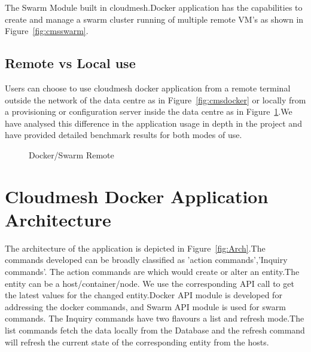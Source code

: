 \documentclass[9pt,twocolumn,twoside]{../../styles/osajnl}
\begin{document}
The Swarm Module built in cloudmesh.Docker application has the capabilities to create and manage a swarm cluster running of multiple remote VM's as shown in Figure~\ref{fig:cmsswarm}. 
\subsection{Remote vs Local use}
Users can choose to use cloudmesh docker application from a remote terminal outside the network of the data centre as in Figure~\ref{fig:cmsdocker} or locally from a provisioning or configuration server inside the data centre as in Figure~\ref{fig:cmsdocker-2}.We have analysed this difference in the application usage in depth in the project and have provided detailed benchmark results for both modes of use.
\begin{figure}[h!]
\centering
{}
\caption{Docker/Swarm Remote }
\label{fig:cmsdocker-2}
\end{figure}



\section{Cloudmesh Docker Application Architecture}
The architecture of the application is depicted in Figure~\ref{fig:Arch}.The commands developed can be broadly classified as 'action commands','Inquiry commands'.
The action commands are which would create or alter an entity.The entity can be a host/container/node. We use the corresponding API call to get the latest values for the changed entity.Docker API module is developed for addressing the docker commands, and Swarm API module is used for swarm commands.
The Inquiry commands have two flavours a list and refresh mode.The list commands fetch the data locally from the Database and the refresh command will refresh the current state of the corresponding entity from the hosts.
\end{document}
